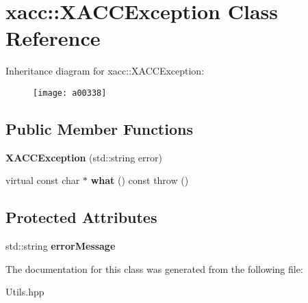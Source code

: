 \hypertarget{a00338}{}\section{xacc\+:\+:X\+A\+C\+C\+Exception Class Reference}
\label{a00338}
Inheritance diagram for xacc\+:\+:X\+A\+C\+C\+Exception\+:\begin{figure}[H]
\begin{center}
\leavevmode
\texttt{[image: a00338]}
\end{center}
\end{figure}
\subsection*{Public Member Functions}
\begin{DoxyCompactItemize}
\item 
{\bfseries X\+A\+C\+C\+Exception} (std\+::string error)\hypertarget{a00338_ab62415ce6e1dd25fb1a074f5741007c9}{}\label{a00338_ab62415ce6e1dd25fb1a074f5741007c9}

\item 
virtual const char $\ast$ {\bfseries what} () const   throw ()\hypertarget{a00338_a5b105218373a9ccd9aac69b6950a017b}{}\label{a00338_a5b105218373a9ccd9aac69b6950a017b}

\end{DoxyCompactItemize}
\subsection*{Protected Attributes}
\begin{DoxyCompactItemize}
\item 
std\+::string {\bfseries error\+Message}\hypertarget{a00338_a31f64c6fb215570571b9b4a3d47eadd0}{}\label{a00338_a31f64c6fb215570571b9b4a3d47eadd0}

\end{DoxyCompactItemize}


The documentation for this class was generated from the following file\+:\begin{DoxyCompactItemize}
\item 
Utils.\+hpp\end{DoxyCompactItemize}
